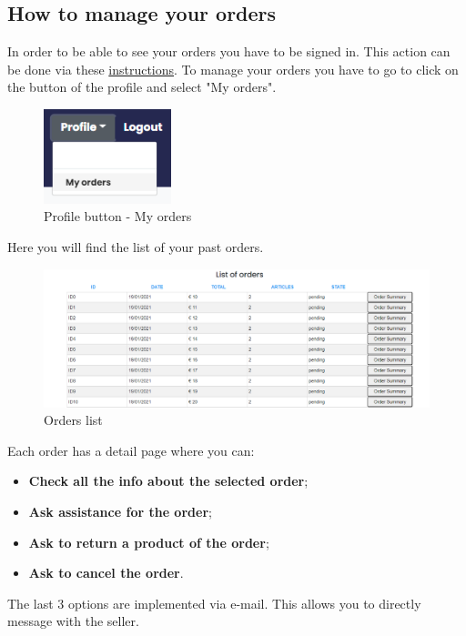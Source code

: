 \subsection{How to manage your orders} \label{_orders}
In order to be able to see your orders you have to be signed in. This action can be done via these \hyperref[_signin]{instructions}.
To manage your orders you have to go to click on the button of the profile and select "My orders".
\begin{figure}[H]
    \centering
    \includegraphics[width=10em]{res/images/cliente/profileorder.png}
    \caption{Profile button - My orders}
\end{figure}
Here you will find the list of your past orders.
\begin{figure}[H]
    \centering
    \includegraphics[width=\linewidth]{res/images/cliente/orders.png}
    \caption{Orders list}
\end{figure}
Each order has a detail page where you can:
\begin{itemize} 
    \item \textbf{Check all the info about the selected order};
    \item \textbf{Ask assistance for the order}; 
    \item \textbf{Ask to return a product of the order}; 
    \item \textbf{Ask to cancel the order}.
\end{itemize}
The last 3 options are implemented via e-mail. This allows you to directly message with the seller.
